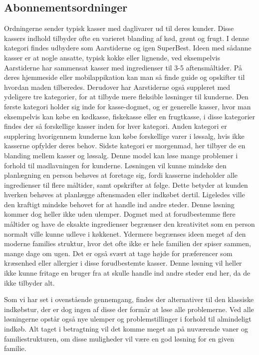 \subsection{Abonnementsordninger}
Ordningerne sender typisk kasser med daglivarer ud til deres kunder.
Disse kassers indhold tilbyder ofte en varieret blanding af kød, grønt og frugt.
I denne kategori findes udbydere som Aarstiderne og igen SuperBest\citep{SOTA_MP_AAR, SOTA_MP_SB}.
Ideen med sådanne kasser er at nogle ansatte, typisk kokke eller lignende, ved eksempelvis Aarstiderne har sammensat kasser med ingredienser til 3-5 aftensmåltider.
På deres hjemmeside eller mobilappikation kan man så finde guide og opskifter til hvordan maden tilberedes.
Derudover har Aarstiderne også suppleret med ydeligere tre kategorier, for at tilbyde mere fleksible løsninger til kunderne.
Den første kategori holder sig inde for kasse-dogmet, og er generelle kasser, hvor man eksempelvis kan købe en kødkasse, fiskekasse eller en frugtkasse, i disse kategorier findes der så forskellige kasser inden for hver kategori.
Anden kategori er supplering hvorigennem kunderne kan købe forskellige varer i løssalg, hvis ikke kasserne opfylder deres behov.
Sidste kategori er morgenmad, her tilbyer de en blanding mellem kasser og løssalg.
Denne model kan løse mange problemer i forhold til madlavningen for kunderne.
Løsningen vil kunne mindske den planlægning en person behøves at foretage sig, fordi kasserne indeholder alle ingredienser til flere måltider, samt opskrifter at følge.
Dette betyder at kunden  hverken behøves at planlægge aftensmaden eller indkøbet dertil.
Ligeledes ville den kraftigt mindske behovet for at handle ind andre steder.
Denne løsning kommer dog heller ikke uden ulemper.
Dogmet med at forudbestemme flere måltider og have de eksakte ingredienser begrænser den kreativitet som en person normalt ville kunne udleve i køkkenet.
Ydermere begrænses ideen meget af den moderne families struktur, hvor det ofte ikke er hele familien der spiser sammen, mange dage om ugen. 
Det er også svært at tage højde for præferencer som kræsenhed eller allergier i disse forudbestemte kasser.
Denne løsning vil heller ikke kunne fritage en bruger fra at skulle handle ind andre steder end her, da de ikke tilbyder alt.

Som vi har set i ovenstående gennemgang, findes der alternativer til den klassiske indkøbstur, der er dog ingen af disse der formår at løse alle problemerne.
Ved alle løsningerne opstår også nye ulemper og problemstillinger i forhold til almindeligt indkøb.
Alt taget i betragtning vil det komme meget an på nuværende vaner og familiestrukturen, om disse muligheder vil være en god løsning for en given familie.

